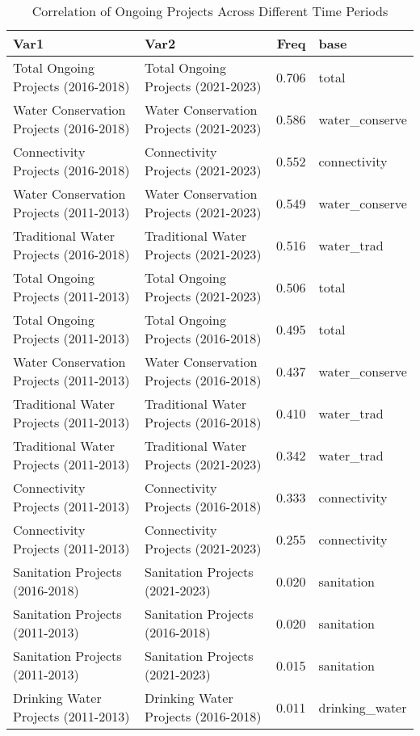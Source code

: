 \begin{table}[ht]
\centering
\caption{Correlation of Ongoing Projects Across Different Time Periods} 
\begin{tabular}{llrl}
  \toprule
Var1 & Var2 & Freq & base \\ 
  \midrule
Total Ongoing Projects (2016-2018) & Total Ongoing Projects (2021-2023) & 0.706 & total \\ 
  Water Conservation Projects (2016-2018) & Water Conservation Projects (2021-2023) & 0.586 & water\_conserve \\ 
  Connectivity Projects (2016-2018) & Connectivity Projects (2021-2023) & 0.552 & connectivity \\ 
  Water Conservation Projects (2011-2013) & Water Conservation Projects (2021-2023) & 0.549 & water\_conserve \\ 
  Traditional Water Projects (2016-2018) & Traditional Water Projects (2021-2023) & 0.516 & water\_trad \\ 
  Total Ongoing Projects (2011-2013) & Total Ongoing Projects (2021-2023) & 0.506 & total \\ 
  Total Ongoing Projects (2011-2013) & Total Ongoing Projects (2016-2018) & 0.495 & total \\ 
  Water Conservation Projects (2011-2013) & Water Conservation Projects (2016-2018) & 0.437 & water\_conserve \\ 
  Traditional Water Projects (2011-2013) & Traditional Water Projects (2016-2018) & 0.410 & water\_trad \\ 
  Traditional Water Projects (2011-2013) & Traditional Water Projects (2021-2023) & 0.342 & water\_trad \\ 
  Connectivity Projects (2011-2013) & Connectivity Projects (2016-2018) & 0.333 & connectivity \\ 
  Connectivity Projects (2011-2013) & Connectivity Projects (2021-2023) & 0.255 & connectivity \\ 
  Sanitation Projects (2016-2018) & Sanitation Projects (2021-2023) & 0.020 & sanitation \\ 
  Sanitation Projects (2011-2013) & Sanitation Projects (2016-2018) & 0.020 & sanitation \\ 
  Sanitation Projects (2011-2013) & Sanitation Projects (2021-2023) & 0.015 & sanitation \\ 
  Drinking Water Projects (2011-2013) & Drinking Water Projects (2016-2018) & 0.011 & drinking\_water \\ 
   \bottomrule
\end{tabular}
\end{table}
